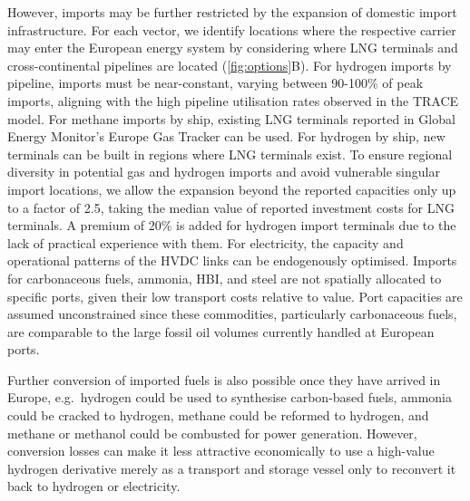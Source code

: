 
However, imports may be further restricted by the expansion of domestic import
infrastructure. For each vector, we identify locations where the respective
carrier may enter the European energy system by considering where LNG terminals
and cross-continental pipelines are located (\cref{fig:options}B). For
hydrogen imports by pipeline, imports must be near-constant, varying between
90-100\% of peak imports, aligning with the high pipeline utilisation rates
observed in the TRACE model. For methane imports by ship, existing LNG terminals
reported in Global Energy Monitor's Europe Gas
Tracker\cite{globalenergymonitorEuropeGasTracker2024} can be used. For hydrogen
by ship, new terminals can be built in regions where LNG terminals exist. To
ensure regional diversity in potential gas and hydrogen imports and avoid
vulnerable singular import locations, we allow the expansion beyond the reported
capacities only up to a factor of 2.5, taking the median value of reported
investment costs for LNG terminals.\cite{GlobalGas2022} A premium of 20\% is
added for hydrogen import terminals due to the lack of practical experience with
them. For electricity, the capacity and operational patterns of the HVDC links
can be endogenously optimised. Imports for carbonaceous fuels, ammonia, HBI, and
steel are not spatially allocated to specific ports, given their low transport
costs relative to value. Port capacities are assumed unconstrained since these
commodities, particularly carbonaceous fuels, are comparable to the large fossil
oil volumes currently handled at European ports.


Further conversion of imported fuels is also possible once they have arrived in
Europe, e.g.~hydrogen could be used to synthesise carbon-based fuels, ammonia
could be cracked to hydrogen, methane could be reformed to hydrogen, and methane
or methanol could be combusted for power generation. However, conversion losses
can make it less attractive economically to use a high-value hydrogen derivative
merely as a transport and storage vessel only to reconvert it back to hydrogen
or electricity.


